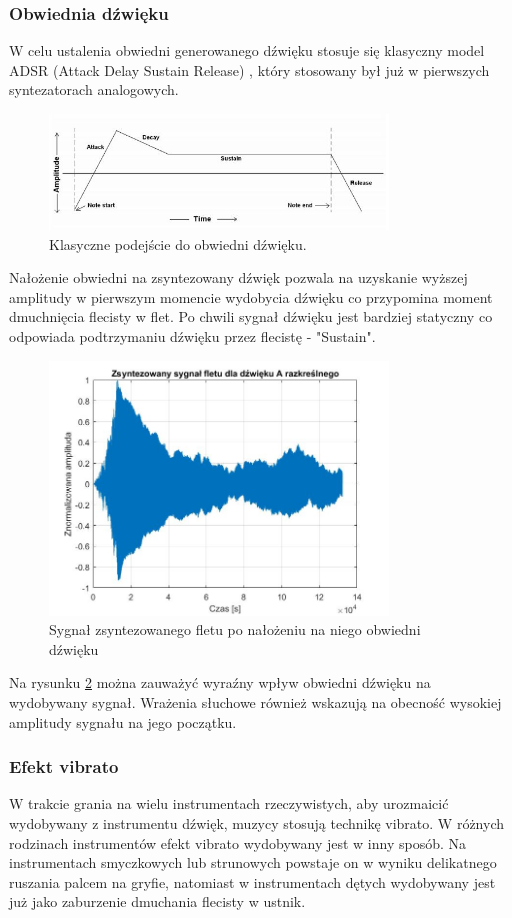 \subsubsection{Obwiednia dźwięku}
W celu ustalenia obwiedni generowanego dźwięku stosuje się klasyczny model ADSR (Attack Delay Sustain Release) \cite{adsr}, który stosowany był już w pierwszych syntezatorach analogowych.
\begin{figure}[H]
	\centering
	\includegraphics[width=9cm]{grafiki/ADSR}
	\captionsetup{justification=centering}
	\caption{Klasyczne podejście do obwiedni dźwięku.}
	\label{rys:adsr}
\end{figure}
Nałożenie obwiedni na zsyntezowany dźwięk pozwala na uzyskanie wyższej amplitudy w pierwszym momencie wydobycia dźwięku co przypomina moment dmuchnięcia flecisty w flet. Po chwili sygnał dźwięku jest bardziej statyczny co odpowiada podtrzymaniu dźwięku przez flecistę - "Sustain".
\begin{figure}[H]
	\centering
	\includegraphics[width=9cm]{grafiki/Dzwiek_zsyntezowanego_fletu_po_ADSR}
	\captionsetup{justification=centering}
	\caption{Sygnał zsyntezowanego fletu po nałożeniu na niego obwiedni dźwięku}
	\label{rys:po_adsr}
\end{figure}
Na rysunku \ref{rys:po_adsr} można zauważyć wyraźny wpływ obwiedni dźwięku na wydobywany sygnał. Wrażenia słuchowe również wskazują na obecność wysokiej amplitudy sygnału na jego początku.

\subsubsection{Efekt vibrato}
W trakcie grania na wielu instrumentach rzeczywistych, aby urozmaicić wydobywany z instrumentu dźwięk, muzycy stosują technikę vibrato. W różnych rodzinach instrumentów efekt vibrato wydobywany jest w inny sposób. Na instrumentach smyczkowych lub strunowych powstaje on w wyniku delikatnego ruszania palcem na gryfie, natomiast w instrumentach dętych wydobywany jest już jako zaburzenie dmuchania flecisty w ustnik.



